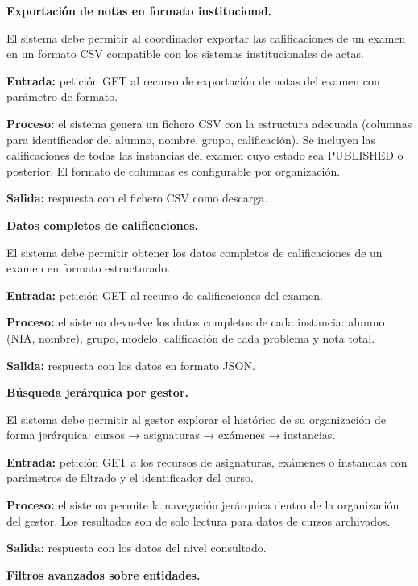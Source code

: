 \begin{functional}
  \begin{functional}
    \item \textbf{Exportación de notas en formato institucional.}

    El sistema debe permitir al coordinador exportar las calificaciones de un examen en un formato CSV compatible con los sistemas institucionales de actas.

    \textbf{Entrada:} petición GET al recurso de exportación de notas del examen con parámetro de formato.

    \textbf{Proceso:} el sistema genera un fichero CSV con la estructura adecuada (columnas para identificador del alumno, nombre, grupo, calificación). Se incluyen las calificaciones de todas las instancias del examen cuyo estado sea PUBLISHED o posterior. El formato de columnas es configurable por organización.

    \textbf{Salida:} respuesta con el fichero CSV como descarga.

    \item \textbf{Datos completos de calificaciones.}

    El sistema debe permitir obtener los datos completos de calificaciones de un examen en formato estructurado.

    \textbf{Entrada:} petición GET al recurso de calificaciones del examen.

    \textbf{Proceso:} el sistema devuelve los datos completos de cada instancia: alumno (NIA, nombre), grupo, modelo, calificación de cada problema y nota total.

    \textbf{Salida:} respuesta con los datos en formato JSON.

    \item \textbf{Búsqueda jerárquica por gestor.}

    El sistema debe permitir al gestor explorar el histórico de su organización de forma jerárquica: cursos → asignaturas → exámenes → instancias.

    \textbf{Entrada:} petición GET a los recursos de asignaturas, exámenes o instancias con parámetros de filtrado y el identificador del curso.

    \textbf{Proceso:} el sistema permite la navegación jerárquica dentro de la organización del gestor. Los resultados son de solo lectura para datos de cursos archivados.

    \textbf{Salida:} respuesta con los datos del nivel consultado.

    \item \textbf{Filtros avanzados sobre entidades.}


\end{functional}
\end{functional}
